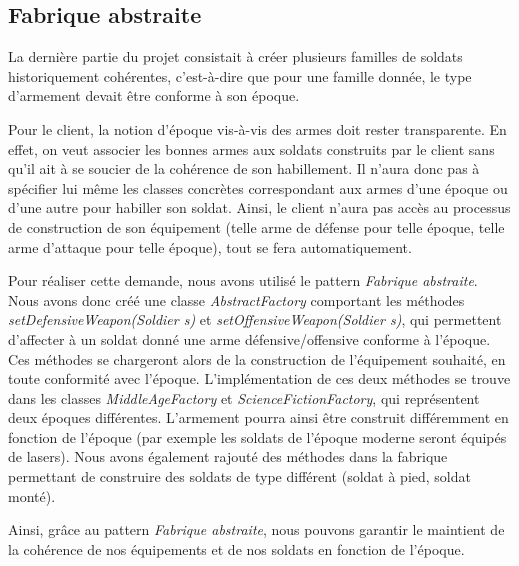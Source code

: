 \subsection{Fabrique abstraite}
La dernière partie du projet consistait à créer plusieurs familles de soldats historiquement cohérentes, c'est-à-dire que pour une famille donnée, le type d'armement devait être conforme à son époque.

Pour le client, la notion d'époque vis-à-vis des armes doit rester transparente. En effet, on veut associer les bonnes armes aux soldats construits par le client sans qu'il ait à se soucier de la cohérence de son habillement. Il n'aura donc pas à spécifier lui même les classes concrètes correspondant aux armes d'une époque ou d'une autre pour habiller son soldat. Ainsi, le client n'aura pas accès au processus de construction de son équipement (telle arme de défense pour telle époque, telle arme d'attaque pour telle époque), tout se fera automatiquement.

Pour réaliser cette demande, nous avons utilisé le pattern \emph{Fabrique abstraite}. Nous avons donc créé une classe \emph{AbstractFactory} comportant les méthodes \emph{setDefensiveWeapon(Soldier s)} et \emph{setOffensiveWeapon(Soldier s)}, qui permettent d'affecter à un soldat donné une arme défensive/offensive conforme à l'époque. Ces méthodes se chargeront alors de la construction de l'équipement souhaité, en toute conformité avec l'époque. L'implémentation de ces deux méthodes se trouve dans les classes \emph{MiddleAgeFactory} et \emph{ScienceFictionFactory}, qui représentent deux époques différentes. L'armement pourra ainsi être construit différemment en fonction de l'époque (par exemple les soldats de l'époque moderne seront équipés de lasers).
Nous avons également rajouté des méthodes dans la fabrique permettant de construire des soldats de type différent (soldat à pied, soldat monté).

Ainsi, grâce au pattern \emph{Fabrique abstraite}, nous pouvons garantir le maintient de la cohérence de nos équipements et de nos soldats en fonction de l'époque.